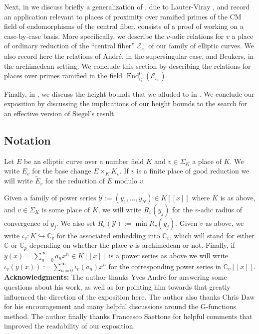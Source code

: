 \documentclass[12pt,twoside,a4paper]{article}
\theoremstyle{plain}%
\DeclareMathOperator{\End}{End}
\newcommand{\Sum}[2]{\displaystyle\sum_{#1}^{#2}}
\newcommand{\C}{\mathbb{C}}
\newcommand{\Q}{\mathbb{Q}}
\newcommand{\CE}{\mathcal{E}}
\newcommand{\ld}{,\ldots,}
\begin{document}
Next, in  we discuss briefly a generalization of \cite{grosszagier}, due to Lauter-Viray \cite{lauterviray}, and record an application relevant to places of proximity over ramified primes of the CM field of endomorphisms of the central fiber.  consists of a proof of  working on a case-by-case basis. More specifically, we describe the $v$-adic relations for $v$ a place of ordinary reduction of the ``central fiber'' $\CE_{s_0}$ of our family of elliptic curves. We also record here the relations of Andr\'e, in the supersingular case, and Beukers, in the archimedean setting. We conclude this section by describing the relations for places over primes ramified in the field $\End^{0}_{\bar{\Q}}(\CE_{s_0})$.

Finally, in , we discuss the height bounds that we alluded to in . We conclude our exposition by discussing the implications of our height bounds to the search for an effective version of Siegel's result.

\subsection{Notation}
Let $E$ be an elliptic curve over a number field $K$ and $v\in\Sigma_{K}$ a place of $K$. We write $E_v$ for the base change $E\times_{K} K_v$. If $v$ is a finite place of good reduction we will write $\tilde{E}_v$ for the reduction of $E$ modulo $v$. 

Given a family of power series $\mathcal{Y}:=(y_1\ld y_N)\in K[[x]]$ where $K$ is as above, and $v\in \Sigma_{K}$ is some place of $K$, we will write $R_v(y_{j})$ for the $v$-adic radius of convergence of $y_j$. We also set $R_{v}(\mathcal{Y}):=\min R_v(y_j)$. Given $v$ as above, we write $\iota_v:K\hookrightarrow \C_v$ for the associated embedding into $\C_v$, which will stand for either $\C$ or $\C_p$ depending on whether the place $v$ is archimedean or not. Finally, if $y(x)=\Sum{n=0}{\infty}a_n x^n\in K[[x]]$ is a power series as above we will write $\iota_v(y(x)):=\Sum{n=0}{\infty}\iota_v(a_n)x^n$ for the corresponding power series in $\C_v[[x]]$.\\

\textbf{Acknowledgments:} The author thanks Yves Andr\'e for answering some questions about his work, as well as for pointing him towards \cite{grosszagier} that greatly influenced the direction of the exposition here. The author also thanks Chris Daw for his encouragement and many helpful discussions around the G-functions method. The author finally thanks Francesco Saettone for helpful comments that improved the readability of our exposition.
\end{document}
